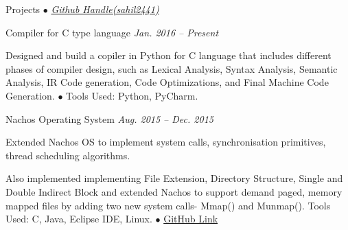 \documentclass{resume} %
\begin{document}
\begin{rSection}{Projects {$\bullet$} \emph{\href{http://www.github.com/sahil2441}{\footnotesize Github Handle(sahil2441)}}}



\begin{rSubsection}{Compiler for C type language} {\emph {Jan. 2016 -- Present}}{}{}
\item Designed and build a copiler in Python for C language that includes different phases of compiler design, such as  
Lexical Analysis, Syntax Analysis, Semantic Analysis, IR Code generation, Code Optimizations, and Final Machine Code Generation.
{\tiny$\bullet$} Tools Used: Python, PyCharm. 
\end{rSubsection}


\begin{rSubsection}{Nachos Operating System} {\emph {Aug. 2015 -- Dec. 2015}}{}{}
\item Extended Nachos OS to implement system calls, synchronisation primitives, thread scheduling algorithms.
\item Also implemented implementing File Extension, Directory Structure, Single and Double Indirect Block and 
extended Nachos to support demand paged, memory mapped files by adding two new system calls- Mmap() and Munmap().
Tools Used: C, Java, Eclipse IDE, Linux. {\tiny$\bullet$}     
\href{https://github.com/sahil2441/Nachos-Operating-System}{GitHub Link}
\end{rSubsection}



\end{rSection}
\end{document}
